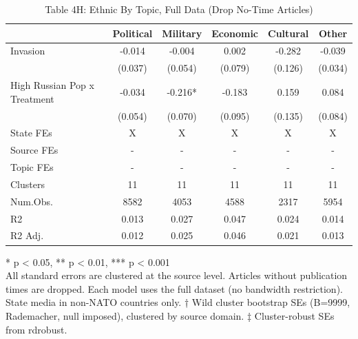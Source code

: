 \begin{table}[t]
\caption{\label{tab:table4h}Table 4H: Ethnic By Topic, Full Data (Drop No-Time Articles)} 
\fontsize{12.0pt}{14.0pt}\selectfont
\begin{tabular*}{\linewidth}{@{\extracolsep{\fill}}lccccc}
\toprule
  & Political & Military & Economic & Cultural & Other \\ 
\midrule\addlinespace[2.5pt]
Invasion & -0.014 & -0.004 & 0.002 & -0.282 & -0.039 \\ 
 & (0.037) & (0.054) & (0.079) & (0.126) & (0.034) \\ 
High Russian Pop x Treatment & -0.034 & -0.216* & -0.183 & 0.159 & 0.084 \\ 
{} & {(0.054)} & {(0.070)} & {(0.095)} & {(0.135)} & {(0.084)} \\ 
State FEs & X & X & X & X & X \\ 
Source FEs & - & - & - & - & - \\ 
Topic FEs & - & - & - & - & - \\ 
Clusters & 11 & 11 & 11 & 11 & 11 \\ 
Num.Obs. & 8582 & 4053 & 4588 & 2317 & 5954 \\ 
R2 & 0.013 & 0.027 & 0.047 & 0.024 & 0.014 \\ 
R2 Adj. & 0.012 & 0.025 & 0.046 & 0.021 & 0.013 \\ 
\bottomrule
\end{tabular*}
\begin{minipage}{\linewidth}
\vspace{.05em}
* p < 0.05, ** p < 0.01, *** p < 0.001\\
All standard errors are clustered at the source level. Articles without
publication times are dropped. Each model uses the full dataset (no bandwidth
restriction). State media in non-NATO countries only. † Wild cluster bootstrap
SEs (B=9999, Rademacher, null imposed), clustered by source domain. ‡
Cluster-robust SEs from rdrobust.\\
\end{minipage}
\end{table}

